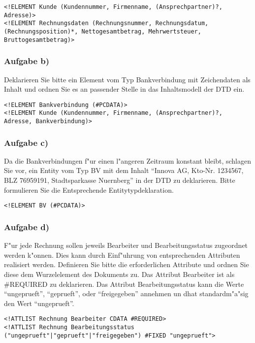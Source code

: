 \lstset{style=customXML}
\begin{lstlisting}
<!ELEMENT Kunde (Kundennummer, Firmenname, (Ansprechpartner)?, Adresse)>
<!ELEMENT Rechnungsdaten (Rechnungsnummer, Rechnungsdatum, (Rechnungsposition)*, Nettogesamtbetrag, Mehrwertsteuer, Bruttogesamtbetrag)>
\end{lstlisting}

\subsubsection{Aufgabe b)}
Deklarieren Sie bitte ein Element vom Typ Bankverbindung mit Zeichendaten als Inhalt und ordnen Sie es an passender Stelle in das Inhaltsmodell der DTD ein.\\
\lstset{style=customXML}
\begin{lstlisting}
<!ELEMENT Bankverbindung (#PCDATA)>
<!ELEMENT Kunde (Kundennummer, Firmenname, (Ansprechpartner)?, Adresse, Bankverbindung)>
\end{lstlisting}

\subsubsection{Aufgabe c)}
Da die Bankverbindungen f"ur einen l"angeren Zeitraum konstant bleibt, schlagen Sie vor, ein Entity vom Typ BV mit dem Inhalt "`Innova AG, Kto-Nr. 1234567, BLZ 76959191, Stadtsparkasse Nuernberg"' in der DTD zu deklarieren.
Bitte formulieren Sie die Entsprechende Entitytypdeklaration.\\

\lstset{style=customXML}
\begin{lstlisting}
<!ELEMENT BV (#PCDATA)>
\end{lstlisting}

\subsubsection{Aufgabe d)}
F"ur jede Rechnung sollen jeweils Bearbeiter und Bearbeitungsstatus zugeordnet werden k"onnen.
Dies kann durch Einf"uhrung von entsprechenden Attributen realisiert werden.
Definieren Sie bitte die erforderlichen Attribute und ordnen Sie diese dem Wurzelelement des Dokuments zu.
Das Attribut Bearbeiter ist als \#REQUIRED zu deklarieren.
Das Attribut Bearbeitungsstatus kann die Werte "`ungeprueft"', "`geprueft"', oder "`freigegeben"' annehmen un dhat standardm"a"sig den Wert "`ungeprueft"'.

\lstset{style=customXML}
\begin{lstlisting}
<!ATTLIST Rechnung Bearbeiter CDATA #REQUIRED>
<!ATTLIST Rechnung Bearbeitungsstatus ("ungeprueft"|"geprueft"|"freigegeben") #FIXED "ungeprueft">
\end{lstlisting}

